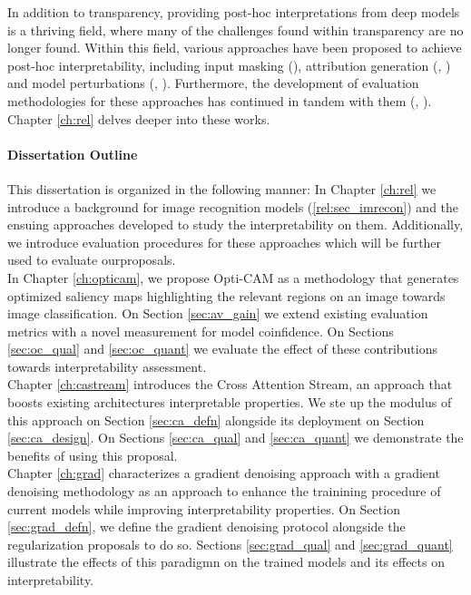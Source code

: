 In addition to transparency, providing post-hoc interpretations from deep models is a 
thriving field, where many of the challenges found within transparency are no longer found.
Within this field, various approaches have been proposed to achieve post-hoc interpretability,
including input masking (\cite{petsiuk2018rise}), attribution generation (\cite{NIPS2017_7062}, 
\cite{zhou2016learning}) and model perturbations 
(\cite{fong2017interpretable}, \cite{fong2019understanding}). Furthermore, the development of 
evaluation methodologies for these approaches has continued in tandem with them 
(\cite{choe2020evaluating}, \cite{chattopadhay2018grad}). Chapter \ref{ch:rel} delves deeper into 
these works. 

\paragraph{Dissertation Outline}
\noindent This dissertation is organized in the following manner: In Chapter \ref{ch:rel} we 
introduce a background for image recognition models (\ref{rel:sec_imrecon}) and the ensuing 
approaches developed to study the interpretability on them. 
Additionally, we introduce evaluation procedures for these approaches which will be further used to 
evaluate ourproposals.\\

\noindent In Chapter \ref{ch:opticam}, we propose Opti-CAM as a methodology that generates 
optimized saliency maps highlighting the relevant regions on an image towards image classification. 
On Section \ref{sec:av_gain} we extend existing evaluation metrics with a novel measurement for 
model coinfidence. 
On Sections \ref{sec:oc_qual} and \ref{sec:oc_quant} we evaluate the effect of these contributions 
towards interpretability assessment.\\

\noindent Chapter \ref{ch:castream} introduces the Cross Attention Stream, an approach that boosts existing 
architectures interpretable properties. We ste up the modulus of this approach on 
Section \ref{sec:ca_defn} alongside its deployment on Section \ref{sec:ca_design}. 
On Sections \ref{sec:ca_qual} and \ref{sec:ca_quant} we demonstrate the benefits of using this
proposal.\\

\noindent Chapter \ref{ch:grad} characterizes a gradient denoising approach with a gradient denoising 
methodology as an approach to enhance the trainining procedure of current models while improving 
interpretability properties. On Section \ref{sec:grad_defn}, we define the gradient denoising 
protocol alongside the regularization proposals to do so.
Sections \ref{sec:grad_qual} and \ref{sec:grad_quant} illustrate the effects of this paradigmn
on the trained models and its effects on interpretability.\\

